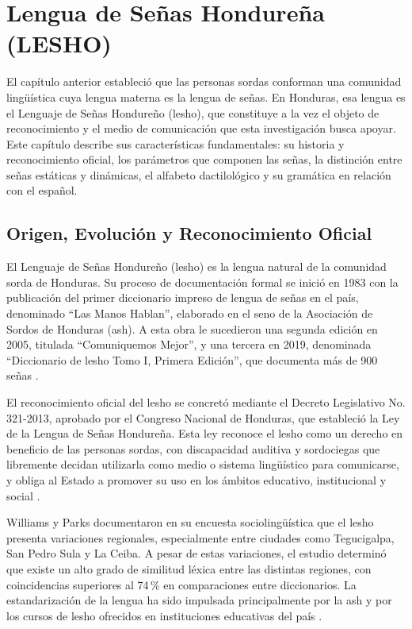 \chapter{Lengua de Señas Hondureña (LESHO)}
\label{cp:lesho}

\insertminitoc
\parindent0pt

El capítulo anterior estableció que las personas sordas conforman una comunidad
lingüística cuya lengua materna es la lengua de señas. En Honduras, esa lengua es el
Lenguaje de Señas Hondureño (\acrshort{lesho}), que constituye a la vez el objeto de reconocimiento
y el medio de comunicación que esta investigación busca apoyar. Este capítulo describe sus
características fundamentales: su historia y reconocimiento oficial, los parámetros que
componen las señas, la distinción entre señas estáticas y dinámicas, el alfabeto
dactilológico y su gramática en relación con el español.

\section{Origen, Evolución y Reconocimiento Oficial}

El Lenguaje de Señas Hondureño (\acrshort{lesho}) es la lengua natural de la comunidad sorda de
Honduras. Su proceso de documentación formal se inició en 1983 con la publicación del
primer diccionario impreso de lengua de señas en el país, denominado ``Las Manos Hablan'',
elaborado en el seno de la Asociación de Sordos de Honduras (\acrshort{ash}). A esta obra le
sucedieron una segunda edición en 2005, titulada ``Comuniquemos Mejor'', y una tercera
en 2019, denominada ``Diccionario de \acrshort{lesho} Tomo I, Primera Edición'', que documenta más
de 900 señas \cite{ash_diccionario_2019}.

El reconocimiento oficial del \acrshort{lesho} se concretó mediante el Decreto Legislativo
No. 321-2013, aprobado por el Congreso Nacional de Honduras, que estableció la Ley de la
Lengua de Señas Hondureña. Esta ley reconoce el \acrshort{lesho} como un derecho en beneficio de
las personas sordas, con discapacidad auditiva y sordociegas que libremente decidan
utilizarla como medio o sistema lingüístico para comunicarse, y obliga al Estado a promover
su uso en los ámbitos educativo, institucional y social \cite{congreso_decreto_2013}.

Williams y Parks documentaron en su encuesta sociolingüística que el \acrshort{lesho} presenta
variaciones regionales, especialmente entre ciudades como Tegucigalpa, San Pedro Sula y
La Ceiba. A pesar de estas variaciones, el estudio determinó que existe un alto grado de
similitud léxica entre las distintas regiones, con coincidencias superiores al 74\,\% en
comparaciones entre diccionarios. La estandarización de la lengua ha sido impulsada
principalmente por la \acrshort{ash} y por los cursos de \acrshort{lesho} ofrecidos en instituciones educativas
del país \cite{williams_encuesta_2015}.

